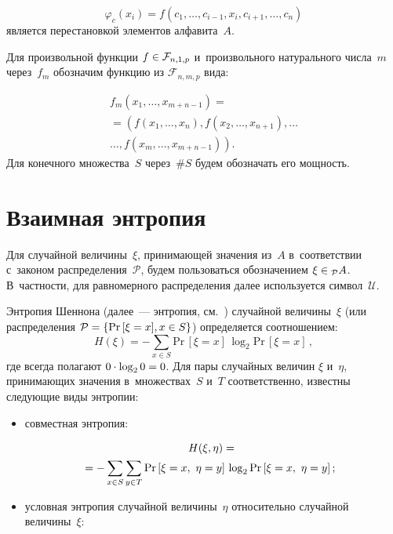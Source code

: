 \begin{multicols}{2}
\noindent
$$
\varphi_{c}(x_i)  = f(c_1, \dots, c_{i-1}, x_i, c_{i+1}, \dots, c_n)
$$
является перестановкой элементов алфавита~$A$.

Для произвольной функции $f \hm\in \mathcal{F}_{n, 1, p}$ и~произвольного 
натурального числа~$m$ через~$f_m$ обозначим функцию из  $\mathcal{F}_{n, m, p}$ 
вида:

\noindent
\begin{multline*}
f_m\left(x_1, \dots, x_{m+n-1}\right) ={}\\ 
{}=\left(f\left(x_1, \dots, x_n\right), f\left(x_2, \dots, x_{n+1}\right), 
\dots\right.\\
\left.\dots, f\left(x_m, \dots, x_{m+n-1}\right)\right).
\end{multline*}
Для конечного множества~$S$ через~$\#S$ будем обозначать его мощность.

\vspace*{-4pt}

\section{Взаимная энтропия} %

\vspace*{-2pt}

Для случайной величины~$\xi$, принимающей значения из~$A$ в~соответствии 
с~законом распределения~$\mathcal{P}$, будем пользоваться обозначением $\xi 
\hm\in_{\mathcal{P}} A$. В~частности, для равномерного распределения далее 
используется символ~$\mathcal{U}$.

Энтропия Шеннона (далее~--- энтропия, см.~\cite{Finstein}) случайной величины~$\xi$ 
(или распределения $\mathcal{P} \hm= \{\mathrm{Pr}\, [ \xi \hm= x], x \hm\in S\}$) 
определяется соотношением:
$$
H(\xi) = - \sum\limits_{x \in S} \mathrm{Pr}\, [\xi = x] \,\log_2 
\mathrm{Pr}\,[\xi = x]\,,
$$
где всегда полагают $0 \cdot \log_2 0 \hm= 0$. Для пары случайных величин 
$\xi$ и~$\eta$, принимающих значения в~множествах~$S$ и~$T$ соответственно, 
известны~\cite{Finstein} следующие виды энтропии:
\begin{itemize}
    \item совместная энтропия:
    
    \noindent
  \begin{multline*}
    H(\xi, \eta) = {}\\
    \hspace*{-16pt}{}=- \sum\limits_{x\in S} \sum\limits_{y\in T} 
    \mathrm{Pr}\,[\xi = x,\ \eta = y]\, 
\log_2 \mathrm{Pr}\,[\xi = x,\ \eta = y]\,;\hspace*{-8pt}
   \end{multline*}
    \item условная энтропия случайной величины~$\eta$ относительно 
случайной величины~$\xi$:


\end{itemize}
\end{multicols}
